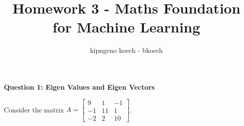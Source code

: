 \documentclass[12pt]{extarticle} %
\begin{document}
\author{kipngeno koech - bkoech}
\title{Homework 3 - Maths Foundation for Machine Learning}   
\maketitle

\medskip

\maketitle
\begin{center}
    \large \textbf{Question 1: Eigen Values and Eigen Vectors}
\end{center}

Consider the matrix $A = \begin{bmatrix} 9 & 1 & -1\\ -1 & 11 & 1 \\ -2 & 2 & 10 \end{bmatrix}$.
\end{document}
